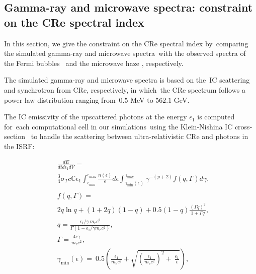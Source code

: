 \documentclass[twocolumn]{aastex631}
\begin{document}
\subsection{Gamma-ray and microwave spectra: constraint on the CRe spectral index}

In this section, we give the constraint on the CRe spectral index by\
comparing the simulated gamma-ray and microwave spectra\
with the observed spectra of the Fermi bubbles \citep{Ackermann2014}\
and the microwave haze \citep{Dobler_2008}, respectively.\

The simulated gamma-ray and microwave spectra is based on the\
IC scattering and synchrotron from CRe, respectively, in which\
the CRe spectrum follows a power-law distribution ranging from\
$0.5$ MeV to $562.1$ GeV.


The IC emissivity of the upscattered photons at the energy $\epsilon_{1}$ is computed for\
each computational cell in our simulations\
using the Klein-Nishina IC cross-section \citep{Jones1968,BLUMENTHAL1970}\
to handle the scattering between ultra-relativistic CRe and photons in the ISRF:

\begin{subequations}
  \begin{align}
  &\frac{dE}{dtd\epsilon_{1}dV} =\nonumber\\
               &\frac{3}{4}\sigma_{T}c\mathbb{C}\epsilon_{1}\int^{\epsilon_{\text{max}}}_{\epsilon_{\text{min}}}
               \frac{n(\epsilon)}{\epsilon}d\epsilon\int^{\gamma_{\text{max}}}_{\gamma_{\text{min}}\left(\epsilon\right)}
               \gamma^{-(p+2)}f(q, \Gamma)d\gamma,\\
  \nonumber\\
  &f(q, \Gamma) =\nonumber\\
               &2q\ln q+(1+2q)(1-q)+0.5(1-q)\frac{\left(\Gamma q\right)^2}{1+\Gamma q},\\
  &q=\frac{\epsilon_{1}/\gamma\
               m_{\text{e}}c^{2}}{\Gamma\left(1-\epsilon_{1}/\gamma m_{\text{e}}c^{2}\right)},\\
  &\Gamma=\frac{4\epsilon \gamma}{m_{\text{e}}c^2},\\
  &\gamma_{\text{min}}(\epsilon)=\
   0.5\left(\frac{\epsilon_{1}}{m_{\text{e}}c^2}+\sqrt{\left(\frac{\epsilon_{1}}{m_{\text{e}}c^2}\right)^2+\
   \frac{\epsilon_{1}}{\epsilon}}\right) \label{gamma-min},
  \end{align}
\label{gammaray-emissivity}
\end{subequations}
\end{document}
